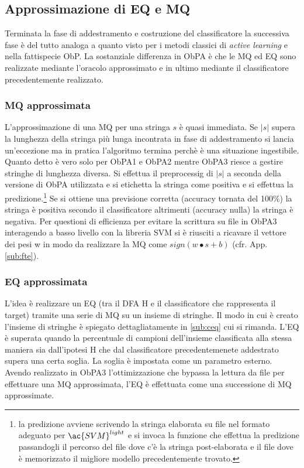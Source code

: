 \subsection{Approssimazione di EQ e MQ}
Terminata la fase di addestramento e costruzione del classificatore la successiva fase  è  del tutto analoga a quanto visto per i metodi classici di \textit{active learning} e nella fattispecie \ac{ObP}. La sostanziale differenza in \ac{ObPA} è che le \ac{MQ} ed \ac{EQ} sono realizzate mediante l'oracolo approssimato e in ultimo mediante il classificatore precedentemente realizzato.
\subsubsection{MQ approssimata}
L'approssimazione di una \ac{MQ} per una stringa $s$ è quasi immediata. Se $|s|$ supera la lunghezza della stringa più lunga incontrata in fase di addestramento si lancia un'eccezione ma in pratica l'algoritmo termina perchè è una situazione ingestibile. Quanto detto è vero solo per \ac{ObPA}1 e \ac{ObPA}2 mentre \ac{ObPA}3 riesce a gestire stringhe di lunghezza diversa. Si effettua il preprocessig di $|s|$ a seconda della versione di \ac{ObPA} utilizzata e si etichetta la stringa come positiva e si effettua la predizione.\footnote{la predizione avviene scrivendo la stringa elaborata su file nel formato adeguato per $\ac{SVM}^{light}$ e si invoca la funzione che effettua la predizione passandogli il percorso del file dove c'è la stringa post-elaborata e il file dove è memorizzato il migliore modello precedentemente trovato.} Se si ottiene una previsione corretta (accuracy tornata del 100$\%$) la stringa è positiva secondo il classificatore altrimenti (accuracy nulla) la stringa è negativa. Per questioni di efficienza per evitare la scrittura su file in \ac{ObPA}3 interagendo a basso livello con la libreria \ac{SVM} si è riusciti a ricavare il vettore dei pesi w in modo da realizzare la \ac{MQ} come $sign(w \bullet s + b)$ (cfr. App.  \ref{sub:fte}).
 
 \subsubsection{EQ approssimata}
L'idea è realizzare un \ac{EQ} (tra il \ac{DFA} \ac{H} e il classificatore che rappresenta il target) tramite una serie di \ac{MQ} su un insieme di stringhe. Il modo in cui è creato l'insieme di stringhe è spiegato dettagliatamente in \ref{sub:ceq} cui si rimanda. L'\ac{EQ} è superata quando la percentuale di campioni dell'insieme  classificata alla stessa maniera sia dall'ipotesi \ac{H} che dal classificatore precedentemenete addestrato supera una certa soglia. La soglia è impostata come un parametro esterno. 
Avendo realizzato in \ac{ObPA}3 l'ottimizzazione che bypassa la lettura da file per effettuare una \ac{MQ} approssimata, l'\ac{EQ} è effettuata come una successione di \ac{MQ} approssimate.



